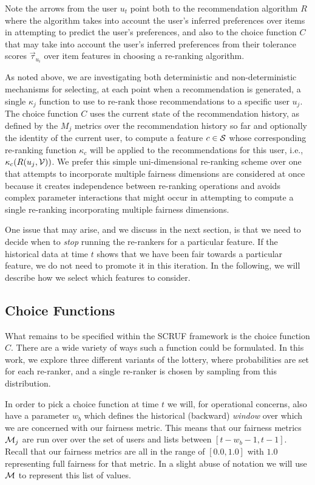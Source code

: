 Note the arrows from the user $u_t$ point both to the recommendation algorithm $R$ where the algorithm takes into account the user's inferred preferences over items in attempting to predict the user's preferences, and also to the choice function $C$ that may take into account the user's inferred preferences from their tolerance scores $\vec{\tau}_{u_i}$ over item features in choosing a re-ranking algorithm. 

As noted above, we are investigating both deterministic and non-deterministic mechanisms for selecting, at each point when a recommendation is generated, a single $\kappa_j$ function to use to re-rank those recommendations to a specific user $u_j$. The choice function $C$ uses the current state of the recommendation history, as defined by the $M_j$ metrics over the recommendation history so far and optionally the identity of the current user, to compute a feature $c \in \mathcal{S}$  whose corresponding re-ranking function $\kappa_c$ will be applied to the recommendations for this user, i.e., $\kappa_c(R(u_j, \mathcal{V}))$. We prefer this simple uni-dimensional re-ranking scheme over one that attempts to incorporate multiple fairness dimensions are considered at once because it creates independence between re-ranking operations and avoids complex parameter interactions that might occur in attempting to compute a single re-ranking incorporating multiple fairness dimensions.

One issue that may arise, and we discuss in the next section, is that we need to decide when to \emph{stop} running the re-rankers for a particular feature. If the historical data at time $t$ shows that we have been fair towards a particular feature, we do not need to promote it in this iteration. In the following, we will describe how we select which features to consider.

\subsection{Choice Functions}

What remains to be specified within the SCRUF framework is the choice function $C$. There are a wide variety of ways such a function could be formulated. In this work, we explore three different variants of the lottery, where probabilities are set for each re-ranker, and a single re-ranker is chosen by sampling from this distribution.

In order to pick a choice function at time $t$ we will, for operational concerns, also have a parameter $w_b$ which defines the historical (backward) \emph{window} over which we are concerned with our fairness metric.  This means that our fairness metrics $\mathcal{M}_j$ are run over over the set of users and lists between $[t - w_b - 1, t-1]$.  Recall that our fairness metrics are all in the range of $[0.0, 1.0]$ with $1.0$ representing full fairness for that metric.  In a slight abuse of notation we will use $\mathcal{M}$ to represent this list of values.


